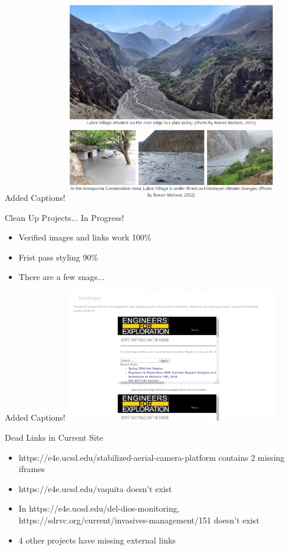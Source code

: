 \begin{frame}{Added Captions!}
    \centering
    \includegraphics[height=0.7\textheight,width=0.7\textwidth,keepaspectratio]{images/Screenshot 2024-04-11 205424.png}
\end{frame}

\begin{frame}{Clean Up Projects... In Progress!}
    \begin{itemize}
        \item Verified images and links work 100\%
        \item Frist pass styling 90\%
        \item There are a few snags...
    \end{itemize}
\end{frame}

\begin{frame}{Added Captions!}
    \centering
    \includegraphics[height=0.7\textheight,width=0.7\textwidth,keepaspectratio]{images/dead_links.png}
\end{frame}

\begin{frame}{Dead Links in Current Site}
    \begin{itemize}
        \item https://e4e.ucsd.edu/stabilized-aerial-camera-platform contains 2 missing iframes
        \item https://e4e.ucsd.edu/vaquita doesn't exist
        \item In https://e4e.ucsd.edu/del-dios-monitoring, https://sdrvc.org/current/invasives-management/151 doesn't exist
        \item 4 other projects have missing external links
    \end{itemize}
\end{frame}

